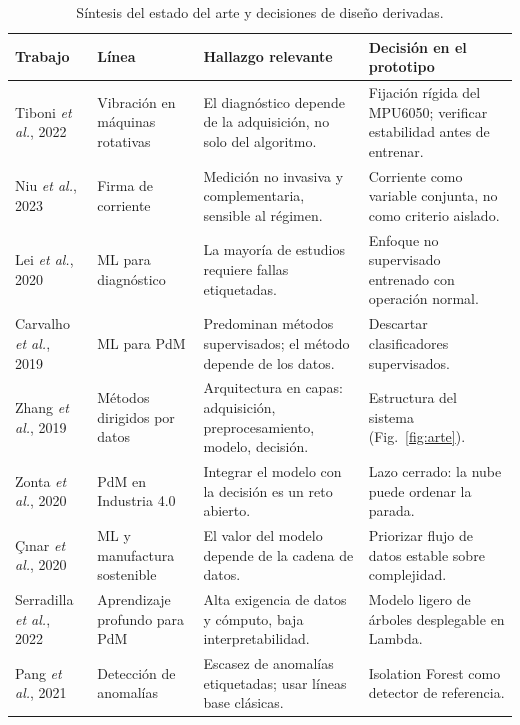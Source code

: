 \documentclass[10pt,twocolumn]{article}
\renewcommand{\arraystretch}{1.1}
\begin{document}
\begin{table}[t]
\centering
\caption{Síntesis del estado del arte y decisiones de diseño derivadas.}
\label{tab:arte}
\footnotesize
\renewcommand{\arraystretch}{1.15}
\begin{tabularx}{\textwidth}{@{}>{\raggedright\arraybackslash}p{2.7cm}>{\raggedright\arraybackslash}p{2.6cm}>{\raggedright\arraybackslash}X>{\raggedright\arraybackslash}X@{}}
\toprule
\textbf{Trabajo} & \textbf{Línea} & \textbf{Hallazgo relevante} & \textbf{Decisión en el prototipo} \\
\midrule
Tiboni \emph{et al.}, 2022~\cite{tiboni2022} & Vibración en máquinas rotativas &
El diagnóstico depende de la adquisición, no solo del algoritmo. &
Fijación rígida del MPU6050; verificar estabilidad antes de entrenar. \\
Niu \emph{et al.}, 2023~\cite{niu2023} & Firma de corriente &
Medición no invasiva y complementaria, sensible al régimen. &
Corriente como variable conjunta, no como criterio aislado. \\
Lei \emph{et al.}, 2020~\cite{lei2020} & ML para diagnóstico &
La mayoría de estudios requiere fallas etiquetadas. &
Enfoque no supervisado entrenado con operación normal. \\
Carvalho \emph{et al.}, 2019~\cite{carvalho2019} & ML para PdM &
Predominan métodos supervisados; el método depende de los datos. &
Descartar clasificadores supervisados. \\
Zhang \emph{et al.}, 2019~\cite{zhang2019} & Métodos dirigidos por datos &
Arquitectura en capas: adquisición, preprocesamiento, modelo, decisión. &
Estructura del sistema (Fig.~\ref{fig:arte}). \\
Zonta \emph{et al.}, 2020~\cite{zonta2020} & PdM en Industria 4.0 &
Integrar el modelo con la decisión es un reto abierto. &
Lazo cerrado: la nube puede ordenar la parada. \\
Çınar \emph{et al.}, 2020~\cite{cinar2020} & ML y manufactura sostenible &
El valor del modelo depende de la cadena de datos. &
Priorizar flujo de datos estable sobre complejidad. \\
Serradilla \emph{et al.}, 2022~\cite{serradilla2022} & Aprendizaje profundo para PdM &
Alta exigencia de datos y cómputo, baja interpretabilidad. &
Modelo ligero de árboles desplegable en Lambda. \\
Pang \emph{et al.}, 2021~\cite{pang2021} & Detección de anomalías &
Escasez de anomalías etiquetadas; usar líneas base clásicas. &
Isolation Forest como detector de referencia. \\

\end{tabularx}
\end{table}
\end{document}
